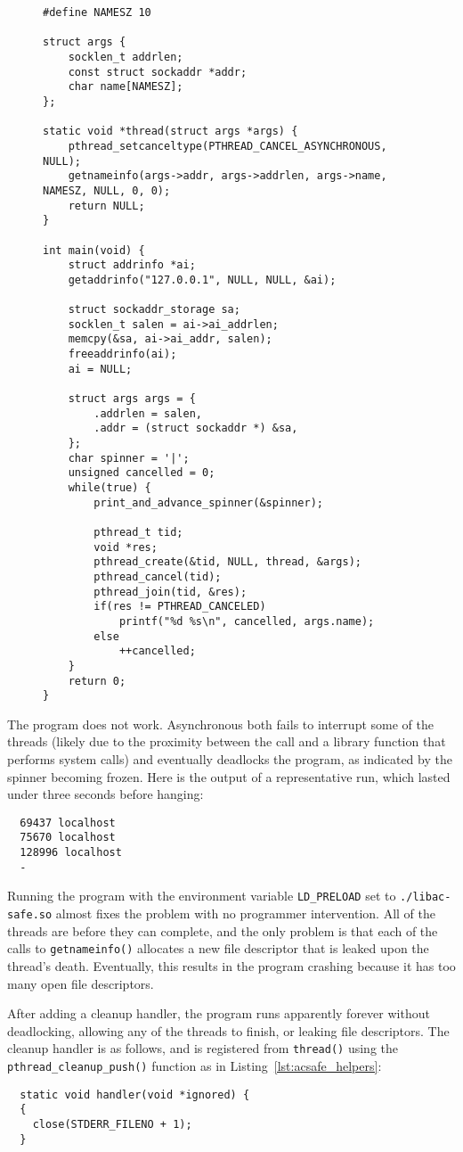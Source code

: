 \begin{figure}
\begin{lstlisting}[label=lst:acsafe_example,caption=Example program using asynchronous thread cancellation]
#define NAMESZ 10

struct args {
	socklen_t addrlen;
	const struct sockaddr *addr;
	char name[NAMESZ];
};

static void *thread(struct args *args) {
	pthread_setcanceltype(PTHREAD_CANCEL_ASYNCHRONOUS, NULL);
	getnameinfo(args->addr, args->addrlen, args->name, NAMESZ, NULL, 0, 0);
	return NULL;
}

int main(void) {
	struct addrinfo *ai;
	getaddrinfo("127.0.0.1", NULL, NULL, &ai);

	struct sockaddr_storage sa;
	socklen_t salen = ai->ai_addrlen;
	memcpy(&sa, ai->ai_addr, salen);
	freeaddrinfo(ai);
	ai = NULL;

	struct args args = {
		.addrlen = salen,
		.addr = (struct sockaddr *) &sa,
	};
	char spinner = '|';
	unsigned cancelled = 0;
	while(true) {
		print_and_advance_spinner(&spinner);

		pthread_t tid;
		void *res;
		pthread_create(&tid, NULL, thread, &args);
		pthread_cancel(tid);
		pthread_join(tid, &res);
		if(res != PTHREAD_CANCELED)
			printf("%d %s\n", cancelled, args.name);
		else
			++cancelled;
	}
	return 0;
}
\end{lstlisting}
\end{figure}

The program does not work.  Asynchronous  both fails to interrupt some
of the threads (likely due to the proximity between the call and a library
function that performs system calls) and eventually deadlocks the program, as
indicated by the spinner becoming frozen.  Here is the output of a representative
run, which lasted under three seconds before hanging:
\begin{lstlisting}
  69437 localhost
  75670 localhost
  128996 localhost
  -
\end{lstlisting}

Running the program with the environment variable \texttt{LD\_PRELOAD} set to
\texttt{./libac-safe.so} almost fixes the problem with no programmer intervention.
All of the threads are  before they can complete, and the only problem is
that each of the calls to \texttt{getnameinfo()} allocates a new file descriptor that
is leaked upon the thread's death.  Eventually, this results in the program crashing
because it has too many open file descriptors.

After adding a cleanup handler, the program runs apparently forever without
deadlocking, allowing any of the threads to finish, or leaking file descriptors.  The
cleanup handler is as follows, and is registered from \texttt{thread()} using the
\texttt{pthread\_cleanup\_push()} function as in Listing~\ref{lst:acsafe_helpers}:
\begin{lstlisting}
  static void handler(void *ignored) {
  {
  	close(STDERR_FILENO + 1);
  }
\end{lstlisting}


\cleardoublepage
